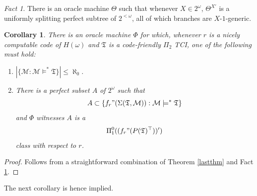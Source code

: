 \documentclass[12pt, twoside]{memoir}
\numberwithin{equation}{section}
\newtheorem{cor}[thm]{Corollary}
\theoremstyle{definition}
\theoremstyle{remark}
\newtheorem{fact}[thm]{Fact}
\theoremstyle{definition}
\theoremstyle{definition}
\theoremstyle{definition}
\theoremstyle{remark}
\begin{document}
\begin{fact}\label{2ndlf}
There is an oracle machine $\Theta$ such that whenever $X \in 2^{\omega}$, $\Theta^{X'}$ is a uniformly splitting perfect subtree of $2^{<\omega}$, all of which branches are $X$-$1$-generic.
\end{fact}

\begin{cor}\label{rlcor}
There is an oracle machine $\Phi$ for which, whenever $r$ is a nicely computable code of $H(\omega)$ and $\mathfrak{T}$ is a code-friendly $\Pi_2$ TCI, one of the following must hold:
\begin{enumerate}[label=(\arabic*)]
    \item $|\{\mathcal{M} : \mathcal{M} \models^* \mathfrak{T}\}| \leq \aleph_0$.
    \item\label{rlcor2} There is a perfect subset $A$ of $2^{\omega}$ such that $$A \subset \{f_r" (\Sigma(\mathfrak{T}, \mathcal{M})) : \mathcal{M} \models^* \mathfrak{T}\}$$ and $\Phi$ witnesses $A$ is a 
    \begin{equation*}
        \Pi^0_1((f_r" (P(\mathfrak{T})^{\top}))')
    \end{equation*}
    class with respect to $r$.
\end{enumerate}
\end{cor}

\begin{proof}
Follows from a straightforward combination of Theorem \ref{lastthm} and Fact \ref{2ndlf}.
\end{proof}

The next corollary is hence implied.
\end{document}
